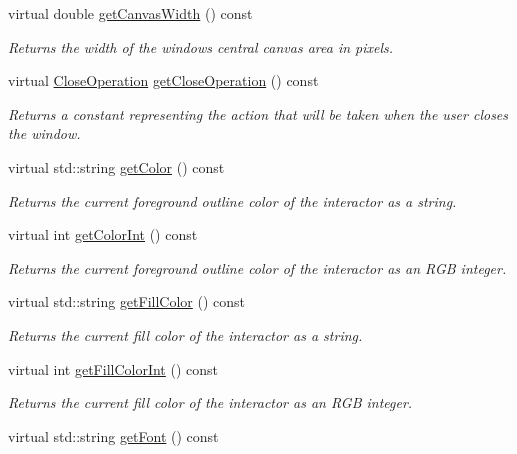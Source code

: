 \begin{DoxyCompactItemize}
virtual double \mbox{\hyperlink{classGWindow_a82ed6884fd4b0257a825e786236c2428}{get\+Canvas\+Width}} () const
\begin{DoxyCompactList}\small\item\em Returns the width of the window\textquotesingle{}s central canvas area in pixels. \end{DoxyCompactList}\item 
virtual \mbox{\hyperlink{classGWindow_a84803201f0f9569db61f51cac9e0d2d2}{Close\+Operation}} \mbox{\hyperlink{classGWindow_a733b18ceeceb7ab98da8c4ac9a8d2857}{get\+Close\+Operation}} () const
\begin{DoxyCompactList}\small\item\em Returns a constant representing the action that will be taken when the user closes the window. \end{DoxyCompactList}\item 
virtual std\+::string \mbox{\hyperlink{classGDrawingSurface_aa061dfa488c31e18549d64363c1d0e34}{get\+Color}} () const
\begin{DoxyCompactList}\small\item\em Returns the current foreground outline color of the interactor as a string. \end{DoxyCompactList}\item 
virtual int \mbox{\hyperlink{classGDrawingSurface_a9635c7af766cdc3417f346683fa0e6c1}{get\+Color\+Int}} () const
\begin{DoxyCompactList}\small\item\em Returns the current foreground outline color of the interactor as an R\+GB integer. \end{DoxyCompactList}\item 
virtual std\+::string \mbox{\hyperlink{classGDrawingSurface_a76f6964a11fde7c78e9751be184e1a3c}{get\+Fill\+Color}} () const
\begin{DoxyCompactList}\small\item\em Returns the current fill color of the interactor as a string. \end{DoxyCompactList}\item 
virtual int \mbox{\hyperlink{classGDrawingSurface_a88f4508d9271c4b5f5b5d6b780f223d0}{get\+Fill\+Color\+Int}} () const
\begin{DoxyCompactList}\small\item\em Returns the current fill color of the interactor as an R\+GB integer. \end{DoxyCompactList}\item 
virtual std\+::string \mbox{\hyperlink{classGDrawingSurface_a894a5502900794eeb27d084c21f1d77d}{get\+Font}} () const

\end{DoxyCompactItemize}
